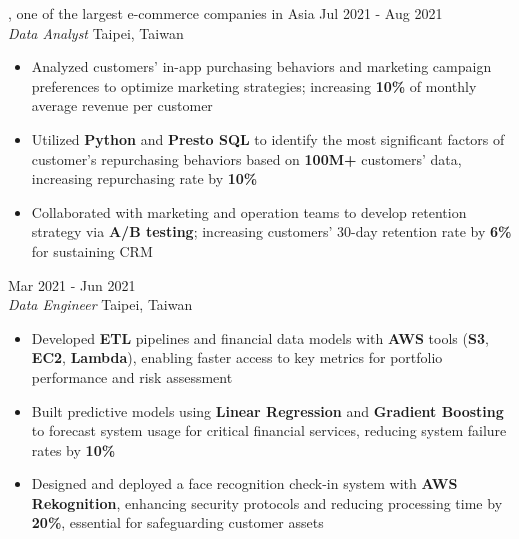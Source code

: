 \documentclass[11pt,letterpaper]{article}
\begin{document}
\vspace{0.3\baselineskip}  %
, one of the largest e-commerce companies in Asia \hfill Jul 2021 - Aug 2021\\[-1pt]
\textit{Data Analyst} \hfill Taipei, Taiwan
\begin{itemize}[leftmargin=1.5em, rightmargin=0pt, itemsep=-1pt, topsep=0pt, parsep=0pt]
  \item \justifying Analyzed customers' in-app purchasing behaviors and marketing campaign preferences to optimize marketing strategies; increasing \textbf{10\%} of monthly average revenue per customer
  \item \justifying Utilized \textbf{Python} and \textbf{Presto SQL} to identify the most significant factors of customer's repurchasing behaviors based on \textbf{100M+} customers' data, increasing repurchasing rate by \textbf{10\%}
  \item \justifying Collaborated with marketing and operation teams to develop retention strategy via \textbf{A/B testing}; increasing customers' 30-day retention rate by \textbf{6\%} for sustaining CRM
\end{itemize}

\vspace{0.3\baselineskip}  %
 \hfill Mar 2021 - Jun 2021\\[-1pt]
\textit{Data Engineer} \hfill Taipei, Taiwan
\begin{itemize}[leftmargin=1.5em, rightmargin=0pt, itemsep=-1pt, topsep=0pt, parsep=0pt]
  \item \justifying Developed \textbf{ETL} pipelines and financial data models with \textbf{AWS} tools (\textbf{S3}, \textbf{EC2}, \textbf{Lambda}), enabling faster access to key metrics for portfolio performance and risk assessment
  \item \justifying Built predictive models using \textbf{Linear Regression} and \textbf{Gradient Boosting} to forecast system usage for critical financial services, reducing system failure rates by \textbf{10\%}
  \item \justifying Designed and deployed a face recognition check-in system with \textbf{AWS Rekognition}, enhancing security protocols and reducing processing time by \textbf{20\%}, essential for safeguarding customer assets
\end{itemize}
\end{document}
